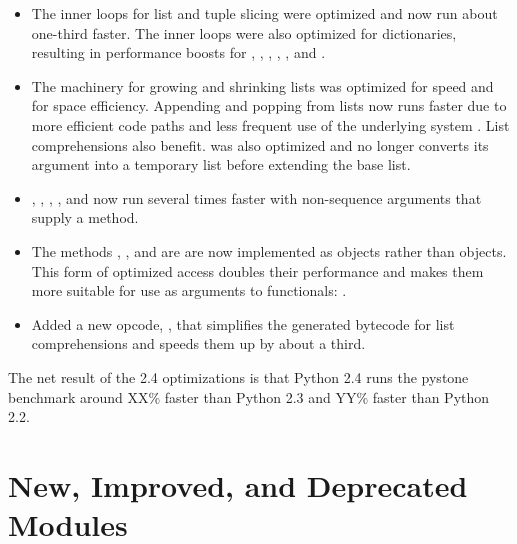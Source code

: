 \documentclass{howto}
\begin{document}
\begin{itemize}

\item The inner loops for list and tuple slicing
 were optimized and now run about one-third faster.  The inner loops
 were also optimized for dictionaries, resulting in performance boosts for
 , , ,
 , , and .

\item The machinery for growing and shrinking lists was optimized for
 speed and for space efficiency.  Appending and popping from lists now
 runs faster due to more efficient code paths and less frequent use of
 the underlying system .  List comprehensions
 also benefit.    was also optimized and no
 longer converts its argument into a temporary list before extending
 the base list.

\item {}, , ,
  , and  now run several times
  faster with non-sequence arguments that supply a 
  method.  

\item The methods ,
  , and  are
  are now implemented as  objects rather
  than  objects.  This form of optimized
  access doubles their performance and makes them more suitable for
  use as arguments to functionals:
  .

\item Added a new opcode, , that simplifies
  the generated bytecode for list comprehensions and speeds them up
  by about a third.

\end{itemize}

The net result of the 2.4 optimizations is that Python 2.4 runs the
pystone benchmark around XX\% faster than Python 2.3 and YY\% faster
than Python 2.2.


\section{New, Improved, and Deprecated Modules}
\end{document}

